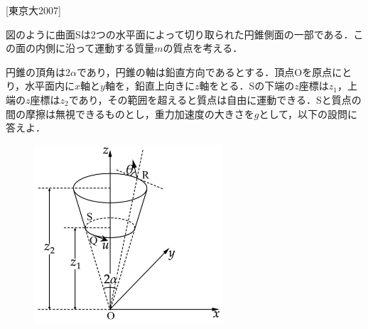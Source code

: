 

\noindent
{} [東京大2007]


図のように曲面Sは2つの水平面によって切り取られた円錐側面の一部である．この面の内側に沿って運動する質量$m$の質点を考える．

円錐の頂角は$2 \alpha$であり，円錐の軸は鉛直方向であるとする．頂点Oを原点にとり，水平面内に$x$軸と$y$軸を，鉛直上向きに$z$軸をとる．Sの下端の$z$座標は$z_1$，上端の$z$座標は$z_2$であり，その範囲を超えると質点は自由に運動できる．Sと質点の間の摩擦は無視できるものとし，重力加速度の大きさを$g$として，以下の設問に答えよ．

\begin{figure}[H]
  \centering
  \includegraphics[width=7cm]{fig/fig_1_8.pdf}
\end{figure}

